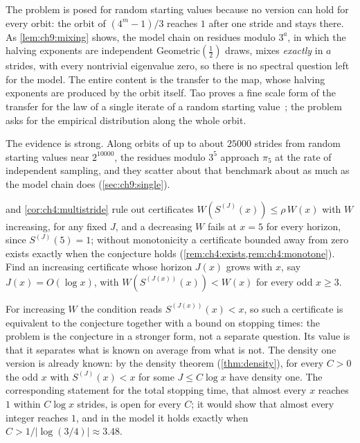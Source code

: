The problem is posed for random starting values because no version can hold
for every orbit: the orbit of $(4^m-1)/3$ reaches $1$ after one stride and
stays there. As
\cref{lem:ch9:mixing} shows, the model chain on residues modulo $3^a$, in which
the halving exponents are independent Geometric$(\tfrac12)$ draws, mixes
\emph{exactly} in $a$ strides, with every nontrivial eigenvalue zero, so there
is no spectral question left
for the model. The entire content is the transfer to the map, whose halving
exponents are produced by the orbit itself. Tao proves a fine scale form of
the transfer for the law of a single iterate of a random starting
value~\cite[Propositions~1.9 and~1.14]{tao2022}; the problem asks for the
empirical distribution along the whole orbit.

The evidence is strong. Along orbits of up to about $25000$ strides from random starting values near $2^{10000}$, the residues modulo $3^5$ approach $\pi_5$ at the rate of independent sampling, and they scatter about that benchmark about as much as the model chain does (\cref{sec:ch9:single}).

\begin{problem*}\label{prob:ch11:o3}
 and \cref{cor:ch4:multistride} rule out certificates $W(S^{(J)}(x))\le\rho\,W(x)$ with $W$ increasing, for any fixed $J$, and a decreasing $W$ fails at $x=5$ for every horizon, since $S^{(J)}(5)=1$; without monotonicity a
certificate bounded away from zero exists exactly when the conjecture holds
(\cref{rem:ch4:exists,rem:ch4:monotone}). Find an increasing certificate whose
horizon $J(x)$ grows with $x$, say $J(x)=O(\log x)$, with
$W(S^{(J(x))}(x))<W(x)$ for every odd $x\ge3$.
\end{problem*}

For increasing $W$ the condition reads $S^{(J(x))}(x)<x$, so such a certificate is equivalent to the conjecture together with a bound on
stopping times: the problem is the conjecture in a stronger form, not a separate question. Its value
is that it separates what is known on average from what is not. The density
one version is already known: by the density theorem (\cref{thm:density}),
for every $C>0$ the odd $x$ with $S^{(J)}(x)<x$ for some $J\le C\log x$ have
density one. The corresponding statement for the total stopping time, that
almost every $x$ reaches $1$ within $C\log x$ strides, is open for every $C$;
it would show that almost every integer reaches $1$, and in the model it holds
exactly when $C>1/|\log(3/4)|\approx3.48$.

